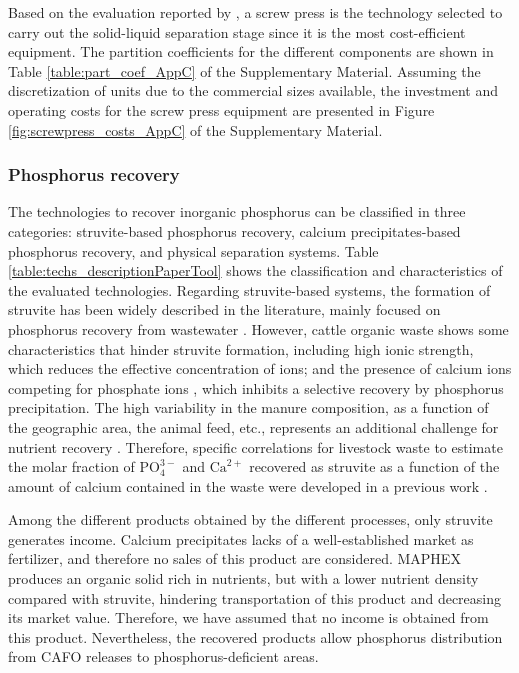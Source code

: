\begin{refsection}[referencesCh4]
Based on the evaluation reported by \citet{MollerSLsep}, a screw press is the technology selected to carry out the solid-liquid separation stage since it is the most cost-efficient
equipment. The partition coefficients for the different components are shown in Table \ref{table:part_coef_AppC} of the Supplementary Material. Assuming the discretization of units due to the commercial sizes available, the investment and operating costs for the screw press equipment are presented in Figure \ref{fig:screwpress_costs_AppC} of the Supplementary Material.

\subsubsection{Phosphorus recovery}
The technologies to recover inorganic phosphorus can be classified in three categories: struvite-based phosphorus recovery, calcium precipitates-based phosphorus recovery, and physical separation systems. Table \ref{table:techs_descriptionPaperTool} shows the classification and characteristics of the evaluated technologies. Regarding struvite-based systems, the formation of struvite has been widely described in the  literature, mainly focused on phosphorus recovery from wastewater \citep{rahaman_modeling_2014, Battistoni}. 
However, cattle organic waste shows some characteristics that hinder struvite formation, including high ionic strength, which reduces the effective concentration of ions; and the presence of calcium ions competing for phosphate ions \citep{Yan2016}, which inhibits a selective recovery by phosphorus precipitation. The high variability in the manure composition, as a function of the geographic area, the animal feed, etc., represents an additional challenge for nutrient recovery \citep{Tao}. Therefore, specific correlations for livestock waste to estimate the molar fraction of $\text{PO}_{4}^{3-}$ and $\text{Ca}^{2+}$ recovered as struvite as a function of the amount of calcium contained in the waste were developed in a previous work \citep{MartinStruvite}. 

Among the different products obtained by the different processes, only struvite generates income. Calcium precipitates lacks of a well-established market as fertilizer, and therefore no sales of this product are considered. MAPHEX produces an organic solid rich in nutrients, but with a lower nutrient density compared with struvite, hindering transportation of this product and decreasing its market value. Therefore, we have assumed that no income is obtained from this product. Nevertheless, the recovered products allow phosphorus distribution from CAFO releases to phosphorus-deficient areas.


\end{refsection}
